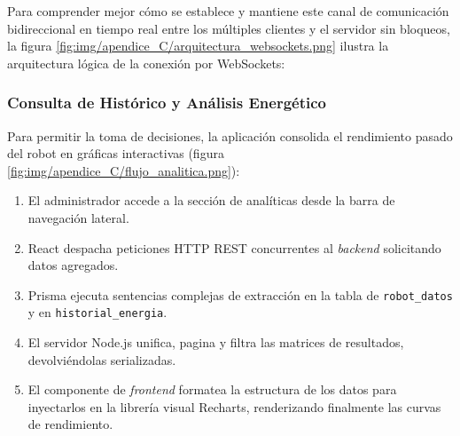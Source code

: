 
Para comprender mejor cómo se establece y mantiene este canal de comunicación bidireccional en tiempo real entre los múltiples clientes y el servidor sin bloqueos, la figura \ref{fig:img/apendice_C/arquitectura_websockets.png} ilustra la arquitectura lógica de la conexión por WebSockets:


\subsubsection{Consulta de Histórico y Análisis Energético}
Para permitir la toma de decisiones, la aplicación consolida el rendimiento pasado del robot en gráficas interactivas (figura \ref{fig:img/apendice_C/flujo_analitica.png}):
\begin{enumerate}
    \item El administrador accede a la sección de analíticas desde la barra de navegación lateral.
    \item React despacha peticiones HTTP REST concurrentes al \textit{backend} solicitando datos agregados.
    \item Prisma ejecuta sentencias complejas de extracción en la tabla de \texttt{robot\_datos} y en \texttt{historial\_energia}.
    \item El servidor Node.js unifica, pagina y filtra las matrices de resultados, devolviéndolas serializadas.
    \item El componente de \textit{frontend} formatea la estructura de los datos para inyectarlos en la librería visual Recharts, renderizando finalmente las curvas de rendimiento.
\end{enumerate}


